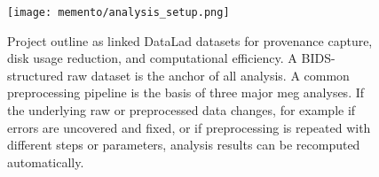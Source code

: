 \begin{figure}[H]
	\centering
	\texttt{[image: memento/analysis\_setup.png]}
	\caption[Memento analysis outline]{Project outline as linked DataLad datasets for provenance capture, disk usage reduction, and computational efficiency. A \gls{BIDS}-structured raw dataset is the anchor of all analysis. A common preprocessing pipeline is the basis of three major \gls{meg} analyses. If the underlying raw or preprocessed data changes, for example if errors are uncovered and fixed, or if preprocessing is repeated with different steps or parameters, analysis results can be recomputed automatically.}
	\label{fig:outline_memento}
\end{figure}
%
%
%

